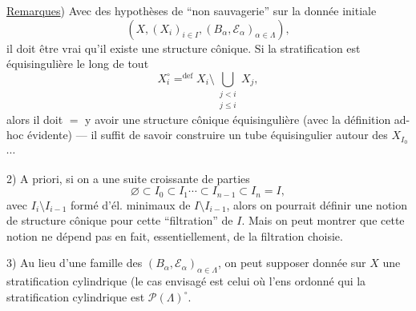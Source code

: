 
\quad \uline{Remarques}) Avec des hypothèses de ``non sauvagerie'' sur la donnée initiale
\[
 (X,(X_i)_{i\in I},(B_\alpha,\mathcal E_\alpha)_{\alpha\in\Lambda}),
\]
il doit être vrai qu'il existe une structure cônique. Si la stratification
 est équisingulière le long de tout
\[
 X_i^\circ\mathrel{\mathop=^{\mathrm{def}}}
 X_i\setminus\bigcup_{\substack{j<i\\j\le i}}X_j,
\]
alors il doit \(=\) y avoir une structure cônique équisingulière
(avec la définition ad-hoc évidente) --- il suffit de savoir construire
un tube équisingulier autour des \(X_{I_0}\) \(\cdots\)

2) A priori, si on a une suite  croissante
de parties
\[
 \varnothing\subset I_0\subset I_1\cdots\subset I_{n-1}\subset I_n=I,
\]
avec 
 \(I_i\setminus I_{i-1}\) formé d'él. minimaux
de \(I\setminus I_{i-1}\), alors on pourrait définir
 une notion de structure cônique
pour cette ``filtration'' de \(I\). Mais on
peut montrer que cette notion ne dépend pas
en fait, essentiellement, de la filtration
choisie.

3) Au lieu d'une famille des \((B_\alpha,\mathcal E_\alpha)_{\alpha\in\Lambda}\),
on peut supposer donnée sur \(X\) une
stratification cylindrique  (le cas envisagé
est celui où l'ens ordonné qui 
 la stratification cylindrique est
\(\mathcal P(\Lambda)^\circ\).

